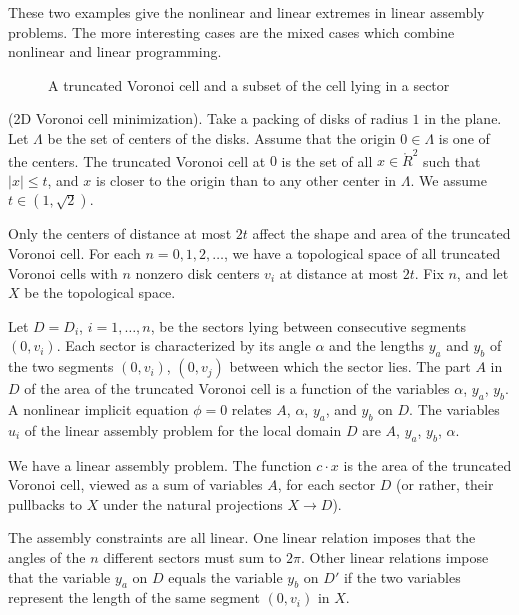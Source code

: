 These two examples give the nonlinear and linear extremes in
linear assembly problems. The more interesting cases are the mixed
cases which combine nonlinear and linear programming.

\begin{figure}[htb]
  \centering
  \caption{A truncated Voronoi cell and a subset of the cell lying in a sector}
  \label{voronoi}
\end{figure}

\begin{example} (2D Voronoi cell minimization). Take a packing of disks of
radius $1$ in the plane.  Let $\Lambda$ be the set of centers of
the disks.  Assume that the origin $0\in\Lambda$ is one of the
centers. The truncated Voronoi cell at $0$ is the set of all
$x\in\ring{R}^2$ such that $|x|\le t$, and $x$ is closer to the
origin than to any other center in $\Lambda$.  We assume
$t\in(1,\sqrt2)$.

Only the centers of distance at most $2t$ affect the shape and
area of the truncated Voronoi cell.  For each $n=0,1,2,\ldots$, we
have a topological space of all truncated Voronoi cells with $n$
nonzero disk centers $v_i$ at distance at most $2t$.  Fix $n$, and
let $X$ be the topological space.

Let $D=D_i$, $i=1,\ldots,n$,  be the sectors lying between
consecutive segments $(0,v_i)$.  Each sector is characterized by
its angle $\alpha$ and the lengths $y_a$ and $y_b$ of the two
segments $(0,v_i)$, $(0,v_j)$ between which the sector lies.  The
part $A$ in $D$ of the area of the truncated Voronoi cell is a
function of the variables $\alpha$, $y_a$, $y_b$.  A nonlinear
implicit equation $\phi=0$ relates $A$, $\alpha$, $y_a$, and $y_b$
on $D$. The variables $u_i$ of the linear assembly problem for the
local domain $D$ are $A$, $y_a$, $y_b$, $\alpha$.


We have a linear assembly problem.  The function $c\cdot x$ is the
area of the truncated Voronoi cell, viewed as a sum of variables
$A$, for each sector $D$ (or rather, their pullbacks to $X$ under
the natural projections $X\to D$).

The assembly constraints are all linear. One linear relation
imposes that the angles of the $n$ different sectors must sum to
$2\pi$. Other linear relations impose that the variable $y_a$ on
$D$ equals the variable $y_b$ on $D'$ if the two variables
represent the length of the same segment $(0,v_i)$ in $X$.
\end{example}



